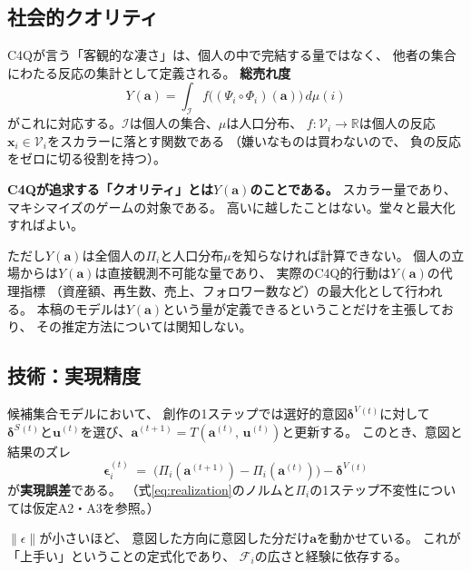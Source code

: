 \documentclass[a4paper, fontsize=10pt]{jlreq}
\newcommand{\R}{\mathbb{R}}
\newcommand{\vx}{\bm{x}}
\newcommand{\va}{\bm{a}}
\newcommand{\vu}{\bm{u}}
\newcommand{\Vi}{\mathcal{V}_i}
\newcommand{\Phii}{\Phi_i}
\newcommand{\Psii}{\Psi_i}
\newcommand{\Fi}{\mathcal{F}_i}
\newcommand{\I}{\mathcal{I}}
\newcommand{\dV}{\bm{\delta}^{V}}          %
\newcommand{\dS}{\bm{\delta}^{S}}          %
\begin{document}
\subsection{社会的クオリティ}\label{subsec:social-quality}

C4Qが言う「客観的な凄さ」は、個人の中で完結する量ではなく、
他者の集合にわたる反応の集計として定義される。
\textbf{総売れ度}
\begin{equation}\label{eq:social-quality}
  Y(\va) = \int_{\I} f\!\bigl((\Psii \circ \Phii)(\va)\bigr)\, d\mu(i)
\end{equation}
がこれに対応する。$\I$は個人の集合、$\mu$は人口分布、
$f : \Vi \to \R$は個人の反応$\vx_i \in \Vi$をスカラーに落とす関数である
（嫌いなものは買わないので、
負の反応をゼロに切る役割を持つ）。

\textbf{C4Qが追求する「クオリティ」とは$Y(\va)$のことである。}
スカラー量であり、マキシマイズのゲームの対象である。
高いに越したことはない。堂々と最大化すればよい。

ただし$Y(\va)$は全個人の$\Pi_i$と人口分布$\mu$を知らなければ計算できない。
個人の立場からは$Y(\va)$は直接観測不可能な量であり、
実際のC4Q的行動は$Y(\va)$の代理指標
（資産額、再生数、売上、フォロワー数など）の最大化として行われる。
本稿のモデルは$Y(\va)$という量が定義できるということだけを主張しており、
その推定方法については関知しない。

\subsection{技術：実現精度}\label{subsec:technique}

候補集合モデルにおいて、
創作の1ステップでは選好的意図$\dV{}^{(t)}$に対して
$\dS{}^{(t)}$と$\vu^{(t)}$を選び、$\va^{(t+1)} = T(\va^{(t)},\, \vu^{(t)})$と更新する。
このとき、意図と結果のズレ
\begin{equation}\label{eq:realization}
  \bm{\epsilon}_i^{(t)}
  \;=\;
  \bigl(\Pi_i(\va^{(t+1)}) - \Pi_i(\va^{(t)})\bigr) - \dV{}^{(t)}
\end{equation}
が\textbf{実現誤差}である。
（式\eqref{eq:realization}のノルムと$\Pi_i$の1ステップ不変性については仮定A2・A3を参照。）

$\lVert\epsilon\rVert$が小さいほど、
意図した方向に意図した分だけ$\va$を動かせている。
これが「上手い」ということの定式化であり、
$\Fi$の広さと経験に依存する。
\end{document}
